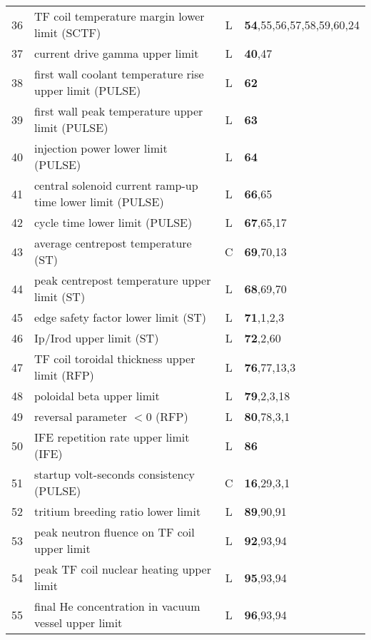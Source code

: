 \documentclass[11pt,a4paper]{report}
\begin{document}
\begin{table}[tbph]
\begin{center}
\begin{tabular}{||c|l|c|l||}
36  & TF coil temperature margin lower limit (SCTF)             & L    & \textbf{54},55,56,57,58,59,60,24 \\
37  & current drive gamma upper limit                           & L    & \textbf{40},47 \\
38  & first wall coolant temperature rise upper limit (PULSE)   & L    & \textbf{62} \\
39  & first wall peak temperature upper limit (PULSE)           & L    & \textbf{63} \\
40  & injection power lower limit (PULSE)                       & L    & \textbf{64} \\
41  & central solenoid current ramp-up time lower limit (PULSE) & L    & \textbf{66},65 \\
42  & cycle time lower limit (PULSE)                            & L    & \textbf{67},65,17 \\
43  & average centrepost temperature (ST)                       & C    & \textbf{69},70,13 \\
44  & peak centrepost temperature upper limit (ST)              & L    & \textbf{68},69,70 \\
45  & edge safety factor lower limit    (ST)                    & L    & \textbf{71},1,2,3 \\
46  & Ip/Irod upper limit               (ST)                    & L    & \textbf{72},2,60 \\
47  & TF coil toroidal thickness upper limit (RFP)              & L    & \textbf{76},77,13,3 \\
48  & poloidal beta upper limit                                 & L    & \textbf{79},2,3,18 \\
49  & reversal parameter $< 0$ (RFP)                            & L    & \textbf{80},78,3,1 \\
50  & IFE repetition rate upper limit (IFE)                     & L    & \textbf{86} \\
51  & startup volt-seconds consistency (PULSE)                  & C    & \textbf{16},29,3,1 \\
52  & tritium breeding ratio lower limit                        & L    & \textbf{89},90,91 \\
53  & peak neutron fluence on TF coil upper limit               & L    & \textbf{92},93,94 \\
54  & peak TF coil nuclear heating upper limit                  & L    & \textbf{95},93,94 \\
55  & final He concentration in vacuum vessel upper limit       & L    & \textbf{96},93,94 \\

\end{tabular}
\end{center}
\end{table}
\end{document}
